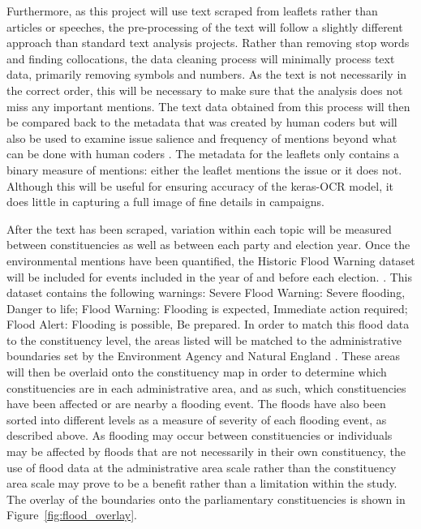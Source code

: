 \documentclass[12pt,letterpaper]{article}
\begin{document}
Furthermore, as this project will use text scraped from leaflets rather than articles or speeches, the pre-processing of the text will follow a slightly different approach than standard text analysis projects. Rather than removing stop words and finding collocations, the data cleaning process will minimally process text data, primarily removing symbols and numbers. As the text is not necessarily in the correct order, this will be necessary to make sure that the analysis does not miss any important mentions. The text data obtained from this process will then be compared back to the metadata that was created by human coders but will also be used to examine issue salience and frequency of mentions beyond what can be done with human coders \autocite{trummParliamentaryCandidatesTheir2023a}. The metadata for the leaflets only contains a binary measure of mentions: either the leaflet mentions the issue or it does not. Although this will be useful for ensuring accuracy of the keras-OCR model, it does little in capturing a full image of fine details in campaigns. 
 


After the text has been scraped, variation within each topic will be measured between constituencies as well as between each party and election year. Once the environmental mentions have been quantified, the Historic Flood Warning dataset will be included for events included in the year of and before each election. \autocite{agencyHistoricFloodWarnings2024}. This dataset contains the following warnings: Severe Flood Warning: Severe flooding, Danger to life; Flood Warning: Flooding is expected, Immediate action required; Flood Alert: Flooding is possible, Be prepared. In order to match this flood data to the constituency level, the areas listed will be matched to the administrative boundaries set by the Environment Agency and Natural England \autocite{NaturalEnglandOpen}. These areas will then be overlaid onto the constituency map in order to determine which constituencies are in each administrative area, and as such, which constituencies have been affected or are nearby a flooding event. The floods have also been sorted into different levels as a measure of severity of each flooding event, as described above. As flooding may occur between constituencies or individuals may be affected by floods that are not necessarily in their own constituency, the use of flood data at the administrative area scale rather than the constituency area scale may prove to be a benefit rather than a limitation within the study. The overlay of the boundaries onto the parliamentary constituencies is shown in Figure~\ref{fig:flood_overlay}.
\end{document}
